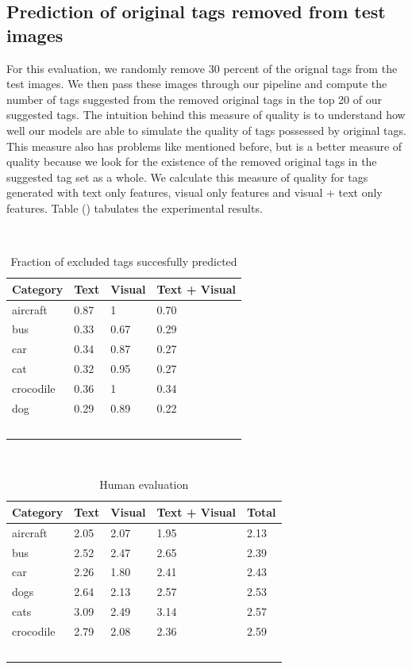 \documentclass[12pt]{article}
\begin{document}
\subsection{Prediction of original tags removed from test images}
For this evaluation, we randomly remove 30 percent of the orignal tags from the test images. We
then pass these images through our pipeline and compute the number of tags suggested from the
removed original tags in the top 20 of our suggested tags. The intuition behind this measure of
quality is to understand how well our models are able to simulate the quality of tags possessed
by original tags. This measure also has problems like mentioned before, but is a better measure
of quality because we look for the existence of the removed original tags in the suggested tag
set as a whole. We calculate this measure of quality for tags generated with text only features,
visual only features and visual + text only features. Table () tabulates the experimental results.


\begin{table}
   \caption{Fraction of excluded tags succesfully predicted}
    \begin{tabular}{|l|l|l|l|}
\hline
Category & Text & Visual & Text + Visual \\
\hline
aircraft & 0.87 & 1 & 0.70 \\
bus  & 0.33 & 0.67 & 0.29 \\
car &  0.34 & 0.87 & 0.27 \\
cat &  0.32 & 0.95 & 0.27 \\
crocodile &  0.36 & 1 & 0.34 \\
dog  & 0.29 & 0.89 & 0.22 \\
\hline
    \end{tabular}
\end{table}


\begin{table}
  \caption{Human evaluation}
    \begin{tabular}{|l|l|l|l|l|}
\hline
Category & Text & Visual & Text + Visual & Total \\
\hline

aircraft & 2.05 & 2.07 & 1.95 & 2.13 \\
bus & 2.52 & 2.47 & 2.65 & 2.39 \\
car & 2.26 & 1.80 & 2.41 & 2.43 \\
dogs & 2.64 & 2.13 & 2.57 & 2.53 \\
cats & 3.09 & 2.49 & 3.14 & 2.57 \\
crocodile & 2.79 & 2.08 & 2.36 & 2.59 \\

\hline
    \end{tabular}
\end{table}
\end{document}
